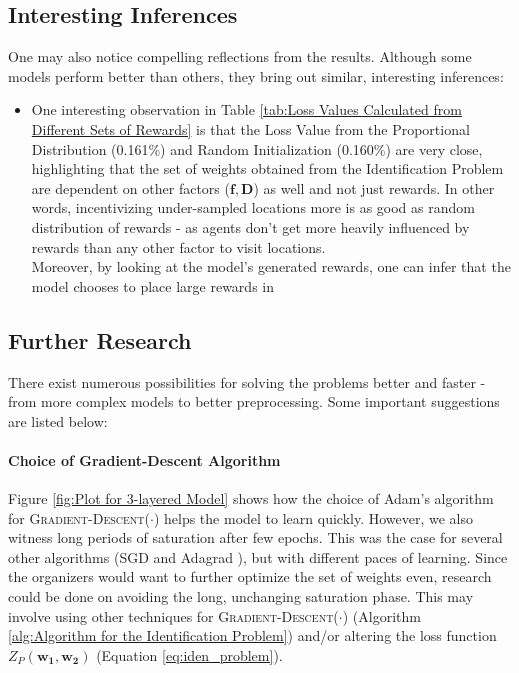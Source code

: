 \documentclass[12pt]{article}
\newcommand{\matr}[1]{\mathbf{#1}}  %
\begin{document}
    \subsection{Interesting Inferences}
    One may also notice compelling reflections from the results. Although some models perform better than others, they bring out similar, interesting inferences:
    \begin{itemize}
        \item One interesting observation in Table \ref{tab:Loss Values Calculated from Different Sets of Rewards} is that the Loss Value from the Proportional Distribution (0.161\%) and Random Initialization (0.160\%) are very close, highlighting that the set of weights obtained from the Identification Problem are dependent on other factors ($\matr{f}, \matr{D}$) as well and not just rewards. In other words, incentivizing under-sampled locations more is as good as random distribution of rewards - as agents don't get more heavily influenced by rewards than any other factor to visit locations.\\
        Moreover, by looking at the model's generated rewards, one can infer that the model chooses to place large rewards in 
    \end{itemize}

    \subsection{Further Research}
    There exist numerous possibilities for solving the problems better and faster - from more complex models to better preprocessing. Some important suggestions are listed below:
    
    \paragraph{Choice of Gradient-Descent Algorithm} Figure \ref{fig:Plot for 3-layered Model} shows how the choice of Adam's algorithm \cite{Adam} for \textsc{Gradient-Descent}($\cdot$) helps the model to learn quickly. However, we also witness long periods of saturation after few epochs. This was the case for several other algorithms (SGD \cite{SGD} and Adagrad \cite{Adagrad}), but with different paces of learning. Since the organizers would want to further optimize the set of weights even, research could be done on avoiding the long, unchanging saturation phase. This may involve using other techniques for \textsc{Gradient-Descent}($\cdot$) (Algorithm \ref{alg:Algorithm for the Identification Problem}) and/or altering the loss function $Z_P(\matr{w_1}, \matr{w_2})$ (Equation \ref{eq:iden_problem}).
    
\end{document}
